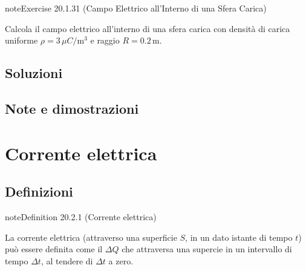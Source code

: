 \documentclass[letterpaper,10pt,italian]{jupyterBook}
\begin{document}
\begin{sphinxadmonition}{note}{Exercise 20.1.31 (Campo Elettrico all’Interno di una Sfera Carica)}



\sphinxAtStartPar
Calcola il campo elettrico all’interno di una sfera carica con densità di carica uniforme \(\rho = 3 \, \mu C/\text{m}^3\) e raggio \(R = 0.2 \, \text{m}\).
\end{sphinxadmonition}



\begin{sphinxVerbatim}[commandchars=\\\{\}]

\end{sphinxVerbatim}

\sphinxstepscope


\subsection{Soluzioni}
\label{\detokenize{ch/electromagnetism/electrostatics-sol:soluzioni}}\label{\detokenize{ch/electromagnetism/electrostatics-sol:physics-hs-electromagnetism-electrostatics-sol}}\label{\detokenize{ch/electromagnetism/electrostatics-sol::doc}}
\sphinxstepscope


\subsection{Note e dimostrazioni}
\label{\detokenize{ch/electromagnetism/electrostatics-notes:note-e-dimostrazioni}}\label{\detokenize{ch/electromagnetism/electrostatics-notes:physics-hs-electromagnetism-electrostatics-notes}}\label{\detokenize{ch/electromagnetism/electrostatics-notes::doc}}


\sphinxstepscope


\section{Corrente elettrica}
\label{\detokenize{ch/electromagnetism/electric-current:corrente-elettrica}}\label{\detokenize{ch/electromagnetism/electric-current:physics-hs-electromagnetism-electric-current}}\label{\detokenize{ch/electromagnetism/electric-current::doc}}



\subsection{Definizioni}
\label{\detokenize{ch/electromagnetism/electric-current:definizioni}}\label{ch/electromagnetism/electric-current:electric-current}
\begin{sphinxadmonition}{note}{Definition 20.2.1 (Corrente elettrica)}



\sphinxAtStartPar
La corrente elettrica (attraverso una superficie \(S\), in un dato istante di tempo \(t\)) può essere definita come il  \(\Delta Q\) che attraversa una supercie in un intervallo di tempo \(\Delta t\), al tendere di \(\Delta t\) a zero.
\end{sphinxadmonition}
\end{document}
